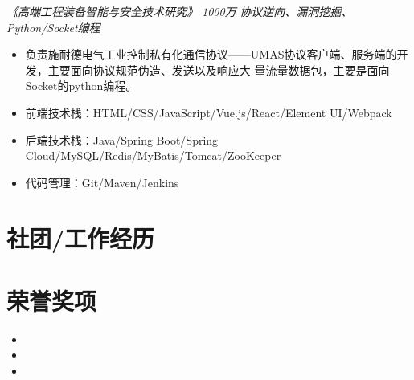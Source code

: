 \documentclass{uniquecv}
\begin{document}
{\it 《高端工程装备智能与安全技术研究》 1000万}
\quad \emph{协议逆向、漏洞挖掘、Python/Socket编程}
\vspace{0.4ex}

\begin{itemize}
  \item 负责施耐德电气工业控制私有化通信协议——UMAS协议客户端、服务端的开发，主要面向协议规范伪造、发送以及响应大
量流量数据包，主要是面向Socket的python编程。
\end{itemize}

{\it }
\vspace{0.4ex}

\begin{itemize}
  \item 前端技术栈：HTML/CSS/JavaScript/Vue.js/React/Element UI/Webpack
  \item 后端技术栈：Java/Spring Boot/Spring Cloud/MySQL/Redis/MyBatis/Tomcat/ZooKeeper
  \item 代码管理：Git/Maven/Jenkins
\end{itemize}


\section{社团/工作经历}

\section{荣誉奖项}


{\it}
\vspace{0.4ex}

\begin{itemize}
  \item {}
  \item {}
  \item {}
\end{itemize}
\end{document}
